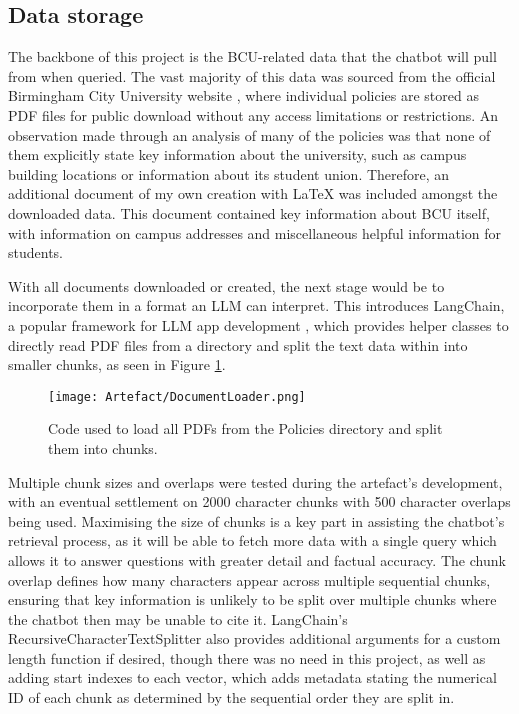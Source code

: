 \subsection{Data storage}
The backbone of this project is the BCU-related data that the chatbot will pull from when queried.
The vast majority of this data was sourced from the official Birmingham City University website \autocite{bcuPoliciesProcedures},
where individual policies are stored as PDF files for public download without any access limitations or restrictions.
An observation made through an analysis of many of the policies was that none of them explicitly state key information about the university,
such as campus building locations or information about its student union. Therefore, an additional document of my own creation with \LaTeX
was included amongst the downloaded data. This document contained key information about BCU itself, with information on campus addresses 
and miscellaneous helpful information for students.

\para With all documents downloaded or created, the next stage would be to incorporate them in a format an LLM can interpret. This introduces 
LangChain, a popular framework for LLM app development \autocite{langchain_introduction_nodate}, which provides helper classes to directly read 
PDF files from a directory and split the text data within into smaller chunks, as seen in Figure \ref{fig:LangChainDocumentLoader}.

\begin{figure}[H]
    \centering
    \texttt{[image: Artefact/DocumentLoader.png]}
    \caption{Code used to load all PDFs from the Policies directory and split them into chunks. \label{fig:LangChainDocumentLoader}}
\end{figure}

\noindent Multiple chunk sizes and overlaps were tested during the artefact's development, with an eventual settlement on 2000 character 
chunks with 500 character overlaps being used. Maximising the size of chunks is a key part in assisting the chatbot's retrieval process,
as it will be able to fetch more data with a single query which allows it to answer questions with greater detail and factual accuracy.
The chunk overlap defines how many characters appear across multiple sequential chunks, ensuring that key information is unlikely to be 
split over multiple chunks where the chatbot then may be unable to cite it. LangChain's RecursiveCharacterTextSplitter also provides 
additional arguments for a custom length function if desired, though there was no need in this project, as well as adding start indexes 
to each vector, which adds metadata stating the numerical ID of each chunk as determined by the sequential order they are split in. 

